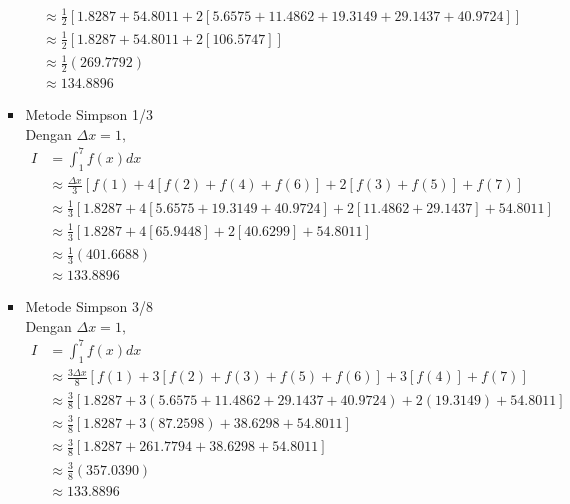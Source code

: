\documentclass{article}
\begin{document}
\begin{enumerate}
\begin{itemize}
\begin{itemize}
\begin{align*}
                &\approx \frac{1}{2} \left [\num{1,8287} + \num{54,8011} + 2 \left [\num{5,6575} + \num{11,4862} + \num{19,3149} + \num{29,1437} + \num{40,9724}\right ] \right ] \\
                &\approx \frac{1}{2} \left [\num{1,8287} + \num{54,8011} + 2 \left [\num{106,5747}\right ] \right ] \\
                &\approx \frac{1}{2} (\num{269,7792}) \\
                &\approx \num{134,8896}
            \end{align*}
            \item Metode Simpson 1/3 \\
            Dengan $\Delta x = 1,$
            \begin{align*}
                I &= \int_{1}^{7} f(x) dx \\
                &\approx \frac{\Delta x}{3} [f(1) + 4[f(2) + f(4) + f(6)] + 2[f(3) + f(5)] + f(7)] \\
                &\approx \frac{1}{3} [\num{1,8287} + 4[\num{5,6575} + \num{19,3149} + \num{40,9724}] + 2[\num{11,4862} + \num{29,1437}] + \num{54,8011}] \\
                &\approx \frac{1}{3} [\num{1,8287} + 4[\num{65,9448}] + 2[\num{40,6299}] + \num{54,8011}] \\ 
                &\approx \frac{1}{3} (\num{401,6688}) \\
                &\approx \num{133,8896}
            \end{align*}
            \item Metode Simpson 3/8 \\
            Dengan $\Delta x = 1,$
            \begin{align*}
                I &= \int_{1}^{7} f(x) dx \\
                &\approx \frac{3\Delta x}{8} [f(1) + 3[f(2) + f(3) + f(5) + f(6)] + 3[f(4)] + f(7)] \\
                &\approx \frac{3}{8} [\num{1,8287} + 3(\num{5,6575} + \num{11,4862} + \num{29,1437} + \num{40,9724}) + 2(\num{19,3149}) + \num{54,8011}] \\
                &\approx \frac{3}{8} [\num{1,8287} + 3(\num{87,2598}) + \num{38,6298} + \num{54,8011}] \\
                &\approx \frac{3}{8} [\num{1,8287} + \num{261,7794} + \num{38,6298} + \num{54,8011}] \\
                &\approx \frac{3}{8} (\num{357,0390}) \\
                &\approx \num{133,8896}
            \end{align*}


\end{itemize}
\end{itemize}
\end{enumerate}
\end{document}

